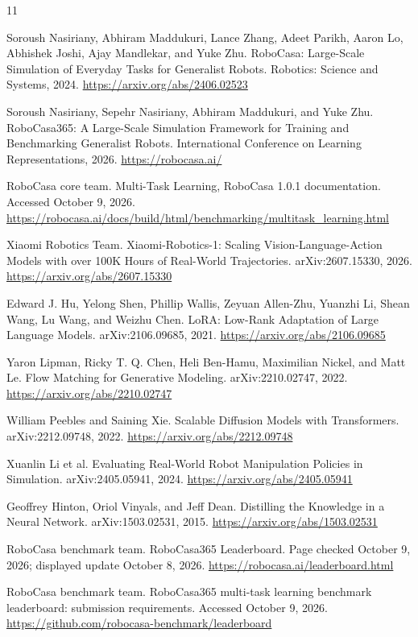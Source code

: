 \documentclass[10pt,twocolumn,letterpaper]{article}
\begin{document}
\begin{thebibliography}{11}

Soroush Nasiriany, Abhiram Maddukuri, Lance Zhang, Adeet Parikh, Aaron Lo, Abhishek Joshi, Ajay Mandlekar, and Yuke Zhu. RoboCasa: Large-Scale Simulation of Everyday Tasks for Generalist Robots. Robotics: Science and Systems, 2024. \url{https://arxiv.org/abs/2406.02523}

Soroush Nasiriany, Sepehr Nasiriany, Abhiram Maddukuri, and Yuke Zhu. RoboCasa365: A Large-Scale Simulation Framework for Training and Benchmarking Generalist Robots. International Conference on Learning Representations, 2026. \url{https://robocasa.ai/}

RoboCasa core team. Multi-Task Learning, RoboCasa 1.0.1 documentation. Accessed October 9, 2026. \url{https://robocasa.ai/docs/build/html/benchmarking/multitask_learning.html}

Xiaomi Robotics Team. Xiaomi-Robotics-1: Scaling Vision-Language-Action Models with over 100K Hours of Real-World Trajectories. arXiv:2607.15330, 2026. \url{https://arxiv.org/abs/2607.15330}

Edward J. Hu, Yelong Shen, Phillip Wallis, Zeyuan Allen-Zhu, Yuanzhi Li, Shean Wang, Lu Wang, and Weizhu Chen. LoRA: Low-Rank Adaptation of Large Language Models. arXiv:2106.09685, 2021. \url{https://arxiv.org/abs/2106.09685}

Yaron Lipman, Ricky T. Q. Chen, Heli Ben-Hamu, Maximilian Nickel, and Matt Le. Flow Matching for Generative Modeling. arXiv:2210.02747, 2022. \url{https://arxiv.org/abs/2210.02747}

William Peebles and Saining Xie. Scalable Diffusion Models with Transformers. arXiv:2212.09748, 2022. \url{https://arxiv.org/abs/2212.09748}

Xuanlin Li et al. Evaluating Real-World Robot Manipulation Policies in Simulation. arXiv:2405.05941, 2024. \url{https://arxiv.org/abs/2405.05941}

Geoffrey Hinton, Oriol Vinyals, and Jeff Dean. Distilling the Knowledge in a Neural Network. arXiv:1503.02531, 2015. \url{https://arxiv.org/abs/1503.02531}

RoboCasa benchmark team. RoboCasa365 Leaderboard. Page checked October 9, 2026; displayed update October 8, 2026. \url{https://robocasa.ai/leaderboard.html}

RoboCasa benchmark team. RoboCasa365 multi-task learning benchmark leaderboard: submission requirements. Accessed October 9, 2026. \url{https://github.com/robocasa-benchmark/leaderboard}

\end{thebibliography}
\end{document}

